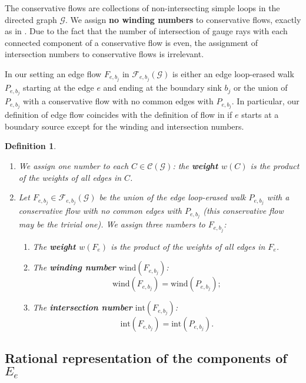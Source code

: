 \documentclass[11pt]{amsart}
\theoremstyle{plain}
\numberwithin{equation}{section}
\newtheorem{definition}{Definition}[subsection]
\begin{document}
The conservative flows are collections of non-intersecting simple loops in the directed graph $\mathcal G$. We assign \textbf{no winding numbers} to conservative flows, exactly as in \cite{Tal2}. Due to the fact that the number of intersection of gauge rays with each connected component of a conservative flow is even, the assignment of intersection numbers to conservative flows is irrelevant. 

In our setting an edge flow  $F_{e,b_j}$ in ${\mathcal F}_{e,b_j}(\mathcal G)$ is either an edge loop-erased walk $P_{e,b_j}$ starting at the edge $e$ and ending at the boundary sink $b_j$ or the union of $P_{e,b_j}$ with a conservative flow with no common edges with $P_{e,b_j}$. In particular, our definition of edge flow coincides with the definition of flow in \cite{Tal2} if $e$ starts at a boundary source except for the winding and intersection numbers.
\begin{definition}\label{def:numb_flows}
\begin{enumerate}
\item We assign one number to each $C\in {\mathcal C}(\mathcal G)$: the \textbf{weight $w(C)$} is the product of the weights of all edges in $C$.
\item Let  $F_{e,b_j}\in{\mathcal F}_{e,b_j}(\mathcal G)$ be  the union of the edge loop-erased walk $P_{e,b_j}$ with a conservative flow with no common edges with $P_{e,b_j}$ (this conservative flow may be the trivial one). We assign three numbers to $F_{e,b_j}$:
\begin{enumerate} 
\item The \textbf{weight $w(F_e)$} is the product of the weights of all edges in $F_e$.
\item The \textbf{winding number} $\mbox{wind}(F_{e,b_j})$:
\begin{equation}
\label{eq:wind_flow}
\mbox{wind}(F_{e,b_j}) = \mbox{wind}(P_{e,b_j});
\end{equation}
\item The \textbf{intersection number} $\mbox{int}(F_{e,b_j})$:
\begin{equation}
\label{eq:int_flow}
\mbox{int}(F_{e,b_j}) = \mbox{int}(P_{e,b_j}).
\end{equation}
\end{enumerate}
\end{enumerate}
\end{definition}

\subsection{Rational representation of the components of $E_e$}\label{sec:rational}
\end{document}
